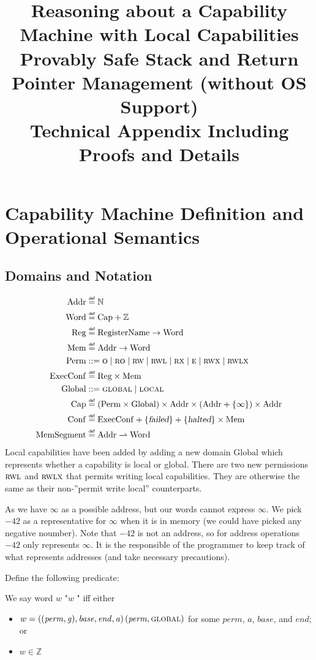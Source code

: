 \documentclass[a4paper]{article}
\title{Reasoning about a Capability Machine with Local Capabilities\\
 Provably Safe Stack and Return Pointer Management (without OS Support)\\
 Technical Appendix Including Proofs and Details}
\newcommand{\parfun}{\rightharpoonup}
\newcommand{\var}[1]{\mathit{#1}}
\newcommand{\gl}{\var{g}}
\newcommand{\addr}{\var{a}}
\newcommand{\start}{\var{base}}
\newcommand{\addrend}{\var{end}}
\newcommand{\inftyend}{-42}
\newcommand{\perm}{\var{perm}}
\newcommand{\stdcap}[1][(\perm,\gl)]{\left(#1,\start,\addrend,\addr \right)}
\newcommand{\failed}{\textsl{failed}}
\newcommand{\halted}{\textsl{halted}}
\newcommand{\plaindom}[1]{\mathrm{#1}}
\newcommand{\Caps}{\plaindom{Cap}}
\newcommand{\Words}{\plaindom{Word}}
\newcommand{\Addrs}{\plaindom{Addr}}
\newcommand{\ExecConfs}{\plaindom{ExecConf}}
\newcommand{\RegName}{\plaindom{RegisterName}}
\newcommand{\Regs}{\plaindom{Reg}}
\newcommand{\Heaps}{\plaindom{Mem}}
\newcommand{\HeapSegments}{\plaindom{MemSegment}}
\newcommand{\Confs}{\plaindom{Conf}}
\newcommand{\nats}{\mathbb{N}}
\newcommand{\ints}{\mathbb{Z}}
\newcommand{\Perms}{\plaindom{Perm}}
\newcommand{\Globals}{\plaindom{Global}}
\newcommand{\plainperm}[1]{\textsc{#1}}
\newcommand{\noperm}{\plainperm{o}}
\newcommand{\readonly}{\plainperm{ro}}
\newcommand{\readwrite}{\plainperm{rw}}
\newcommand{\exec}{\plainperm{rx}}
\newcommand{\entry}{\plainperm{e}}
\newcommand{\rwx}{\plainperm{rwx}}
\newcommand{\readwritel}{\plainperm{rwl}}
\newcommand{\rwlx}{\plainperm{rwlx}}
\newcommand{\local}{\plainperm{local}}
\newcommand{\glob}{\plainperm{global}}
\newcommand{\nonlocal}[1]{\ensuremath{#1} \text{ is non-local}}
\newcommand{\isdef}{\mathrel{\overset{\makebox[0pt]{\mbox{\normalfont\tiny\sffamily def}}}{=}}}
\newcommand\bnfdef{\mathrel{::=}}
\begin{document}
\maketitle
\tableofcontents

\section{Capability Machine Definition and Operational Semantics}
\subsection{Domains and Notation}

\begin{align*}
  \Addrs &\isdef \nats\\
  \Words &\isdef \Caps + \ints \\
  \Regs  &\isdef \RegName \rightarrow \Words\\
  \Heaps &\isdef \Addrs \rightarrow \Words \\
  \Perms &\bnfdef  \noperm\mid \readonly\mid \readwrite\mid \readwritel\mid \exec\mid \entry\mid \rwx\mid \rwlx\\
  \ExecConfs  &\isdef \Regs \times \Heaps \\
  \Globals & \bnfdef \glob\mid \local \\
  \Caps  &\isdef (\Perms \times \Globals) \times \Addrs \times (\Addrs + \{ \infty \}) \times \Addrs\\
  \Confs &\isdef \ExecConfs + \{\failed \} + \{\halted\} \times \Heaps \\
  \HeapSegments &\isdef \Addrs \parfun \Words
\end{align*}
Local capabilities have been added by adding a new domain $\Globals$ which represents whether a capability is local or global. There are two new permissions $\readwritel$ and $\rwlx$ that permits writing local capabilities. They are otherwise the same as their non-''permit write local'' counterparts.

As we have $\infty$ as a possible address, but our words cannot express $\infty$. We pick $\inftyend$ as a representative for $\infty$ when it is in memory (we could have picked any negative noumber). Note that $\inftyend$ is not an address, so for address operations $\inftyend$ only represents $\infty$. It is the responsible of the programmer to keep track of what represents addresses (and take necessary precautions).

Define the following predicate:
\begin{definition}
  \label{def:non-local-cap}
  We say word $w$ "\nonlocal{w}" iff either
  \begin{itemize}
  \item $w = \stdcap{(\perm,\glob)}$ for some $\perm$, $\addr$, $\start$, and $\addrend$; or
  \item $w \in \ints$
  \end{itemize}
\end{definition}
\end{document}
